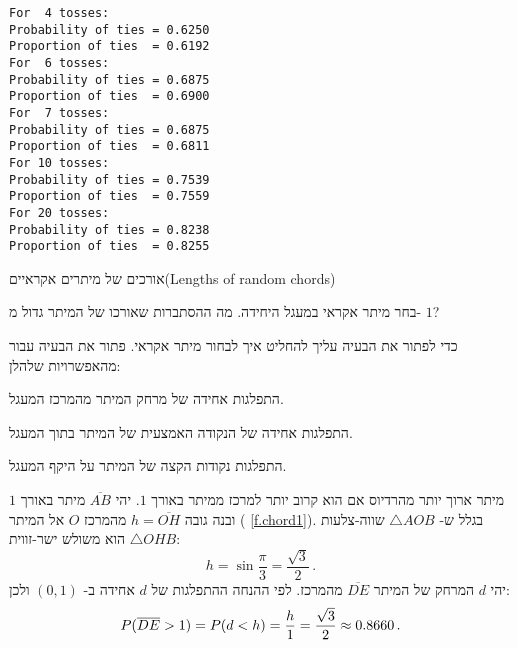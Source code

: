 \sml{}
\begin{verbatim}
For  4 tosses:
Probability of ties = 0.6250
Proportion of ties  = 0.6192
For  6 tosses:
Probability of ties = 0.6875
Proportion of ties  = 0.6900
For  7 tosses:
Probability of ties = 0.6875
Proportion of ties  = 0.6811
For 10 tosses:
Probability of ties = 0.7539
Proportion of ties  = 0.7559
For 20 tosses:
Probability of ties = 0.8238
Proportion of ties  = 0.8255
\end{verbatim}






\begin{prob}{אורכים של מיתרים אקראיים}{}{(Lengths of random chords)}

בחר מיתר אקראי במעגל היחידה. מה ההסתברות שאורכו של המיתר גדול מ-%
$1$?

כדי לפתור את הבעיה עליך להחליט איך לבחור מיתר אקראי. פתור את הבעיה עבור מהאפשרויות שלהלן:

התפלגות אחידה של מרחק המיתר מהמרכז המעגל.

התפלגות אחידה של הנקודה האמצעית של המיתר בתוך המעגל.

התפלגות נקודות הקצה של המיתר על היקף המעגל.
\end{prob}

\solution{}

מיתר ארוך יותר מהרדיוס אם הוא קרוב יותר למרכז ממיתר באורך 
$1$.
יהי 
$\overline{AB}$
מיתר באורך 
$1$
ובנה גובה
$h=\overline{OH}$
מהמרכז 
$O$
אל המיתר (%
\ref{f.chord1}). 
בגלל ש-%
$\triangle AOB$
שווה-צלעות
$\triangle OHB$ 
הוא משולש ישר-זווית:
\[
h = \sin \frac{\pi}{3} = \frac{\sqrt{3}}{2}\,.
\]
יהי
$d$
המרחק של המיתר 
$\overline{DE}$
מהמרכז. לפי ההנחה ההתפלגות של
$d$
אחידה ב-%
$(0,1)$
ולכן:
\[
P(\overline{DE}>1)=P(d<h)=\displaystyle\frac{h}{1}=\frac{\sqrt{3}}{2} \approx 0.8660\,.
\]


